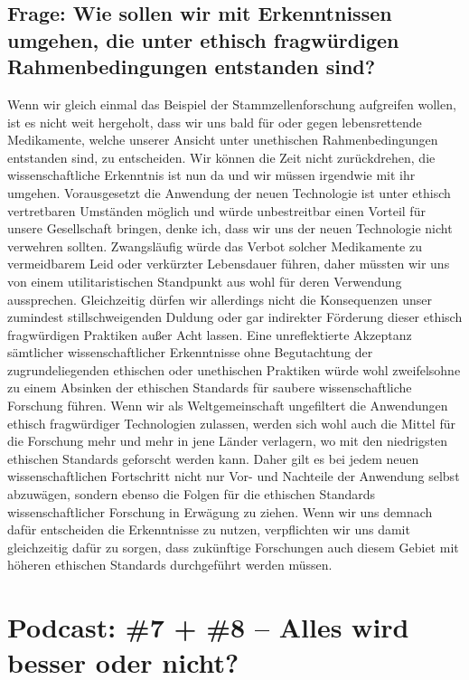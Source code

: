\documentclass[twoside, a4paper, DIV=11, open=any, bibliography=totoc]{scrbook}
\begin{document}
\subsection{Frage: Wie sollen wir mit Erkenntnissen umgehen, die unter ethisch fragwürdigen Rahmenbedingungen entstanden sind?}

Wenn wir gleich einmal das Beispiel der Stammzellenforschung aufgreifen wollen,
ist es nicht weit hergeholt, dass wir uns bald für oder gegen lebensrettende Medikamente,
welche unserer Ansicht unter unethischen Rahmenbedingungen entstanden sind, zu entscheiden.
Wir können die Zeit nicht zurückdrehen, die wissenschaftliche Erkenntnis ist nun da
und wir müssen irgendwie mit ihr umgehen. Vorausgesetzt die Anwendung der neuen
Technologie ist unter ethisch vertretbaren Umständen möglich und würde unbestreitbar
einen Vorteil für unsere Gesellschaft bringen, denke ich, dass wir
uns der neuen Technologie nicht verwehren sollten. Zwangsläufig würde das Verbot
solcher Medikamente zu vermeidbarem Leid oder verkürzter Lebensdauer führen, daher
müssten wir uns von einem utilitaristischen Standpunkt aus wohl für deren Verwendung aussprechen.
Gleichzeitig dürfen wir allerdings nicht die Konsequenzen unser zumindest stillschweigenden
Duldung oder gar indirekter Förderung dieser ethisch fragwürdigen Praktiken außer Acht lassen.
Eine unreflektierte Akzeptanz sämtlicher wissenschaftlicher Erkenntnisse ohne
Begutachtung der zugrundeliegenden ethischen oder unethischen Praktiken würde wohl
zweifelsohne zu einem Absinken der ethischen Standards für saubere wissenschaftliche Forschung führen.
Wenn wir als Weltgemeinschaft ungefiltert die Anwendungen ethisch fragwürdiger Technologien
zulassen, werden sich wohl auch die Mittel für die Forschung mehr und mehr in jene Länder
verlagern, wo mit den niedrigsten ethischen Standards geforscht werden kann.
Daher gilt es bei jedem neuen wissenschaftlichen Fortschritt nicht nur Vor- und Nachteile
der Anwendung selbst abzuwägen, sondern ebenso die Folgen für die ethischen Standards
wissenschaftlicher Forschung in Erwägung zu ziehen.
Wenn wir uns demnach dafür entscheiden die Erkenntnisse zu nutzen, verpflichten
wir uns damit gleichzeitig dafür zu sorgen, dass zukünftige Forschungen auch diesem
Gebiet mit höheren ethischen Standards durchgeführt werden müssen.

\section{Podcast: \#7 + \#8 -- Alles wird besser oder nicht?}
\end{document}

